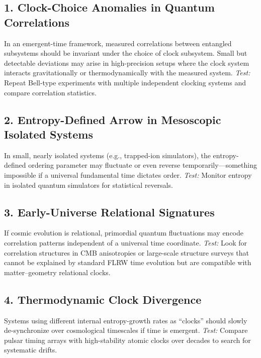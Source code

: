 \documentclass[12pt]{article}
\begin{document}
\subsection*{1. Clock-Choice Anomalies in Quantum Correlations}
In an emergent-time framework, measured correlations between entangled subsystems should be invariant under the choice of clock subsystem. Small but detectable deviations may arise in high-precision setups where the clock system interacts gravitationally or thermodynamically with the measured system. \emph{Test:} Repeat Bell-type experiments with multiple independent clocking systems and compare correlation statistics.

\subsection*{2. Entropy-Defined Arrow in Mesoscopic Isolated Systems}
In small, nearly isolated systems (e.g., trapped-ion simulators), the entropy-defined ordering parameter may fluctuate or even reverse temporarily—something impossible if a universal fundamental time dictates order. \emph{Test:} Monitor entropy in isolated quantum simulators for statistical reversals.

\subsection*{3. Early-Universe Relational Signatures}
If cosmic evolution is relational, primordial quantum fluctuations may encode correlation patterns independent of a universal time coordinate. \emph{Test:} Look for correlation structures in CMB anisotropies or large-scale structure surveys that cannot be explained by standard FLRW time evolution but are compatible with matter–geometry relational clocks.

\subsection*{4. Thermodynamic Clock Divergence}
Systems using different internal entropy-growth rates as ``clocks'' should slowly de-synchronize over cosmological timescales if time is emergent. \emph{Test:} Compare pulsar timing arrays with high-stability atomic clocks over decades to search for systematic drifts.
\end{document}
